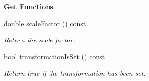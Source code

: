 \begin{Indent}{\bf Get Functions}
\begin{DoxyCompactItemize}
\hyperlink{_super_l_u_support_8h_a8956b2b9f49bf918deed98379d159ca7}{double} \hyperlink{class_g_l_c___user_input_ace6e13cdb480e56a22cf5de7a01150bf}{scale\-Factor} () const 
\begin{DoxyCompactList}\small\item\em Return the scale factor. \end{DoxyCompactList}\item 
bool \hyperlink{class_g_l_c___user_input_a1836e7bc150cb2cfe3961ca9ff9669ee}{transformation\-Is\-Set} () const 
\begin{DoxyCompactList}\small\item\em Return true if the transformation has been set. \end{DoxyCompactList}\end{DoxyCompactItemize}
\end{Indent}
